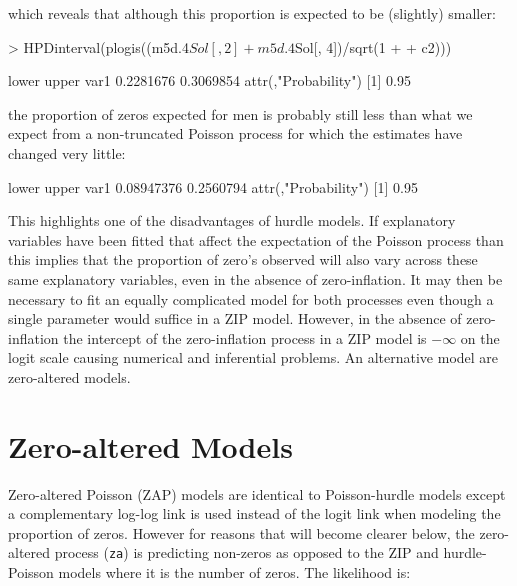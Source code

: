 \documentclass{article}
\begin{document}
which reveals that although this proportion is expected to be (slightly) smaller: 


\begin{Schunk}
\begin{Sinput}
> HPDinterval(plogis((m5d.4$Sol[, 2] + m5d.4$Sol[, 4])/sqrt(1 + 
+     c2)))
\end{Sinput}
\begin{Soutput}
         lower     upper
var1 0.2281676 0.3069854
attr(,"Probability")
[1] 0.95
\end{Soutput}
\end{Schunk}


the proportion of zeros expected for men is probably still less than what we expect from a non-truncated Poisson process for which the estimates have changed very little:

\begin{Schunk}
\begin{Soutput}
          lower     upper
var1 0.08947376 0.2560794
attr(,"Probability")
[1] 0.95
\end{Soutput}
\end{Schunk}


This highlights one of the disadvantages of hurdle models. If explanatory variables have been fitted that affect the expectation of the Poisson process than this implies that the proportion of zero's observed will also vary across these same explanatory variables, even in the absence of zero-inflation. It may then be necessary to fit an equally complicated model for both processes even though a single parameter would suffice in a ZIP model. However, in the absence of zero-inflation the intercept of the zero-inflation process in a ZIP model is $-\infty$ on the logit scale causing numerical and inferential problems. An alternative model are zero-altered models. 

\section{Zero-altered Models}
\label{ZAP}

Zero-altered Poisson (ZAP) models are identical to Poisson-hurdle models except a complementary log-log link is used instead of the logit link when modeling the proportion of zeros. However for reasons that will become clearer below, the zero-altered process (\texttt{za}) is predicting non-zeros as opposed to the ZIP and hurdle-Poisson models where it is the number of zeros.  The likelihood is:
\end{document}
